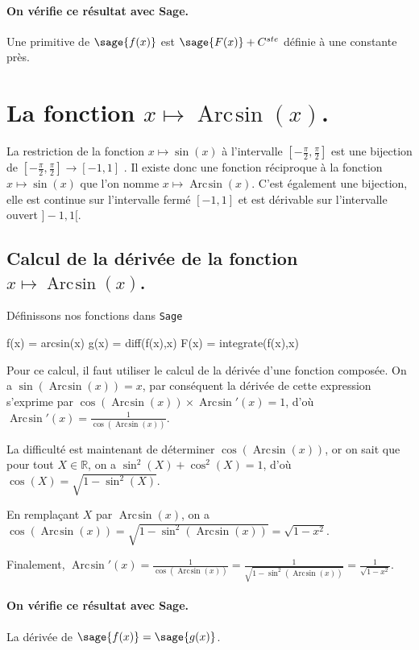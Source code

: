 \documentclass[a4paper,12pt]{report}
\def\eclaire{\mathbb}
\def\R{\ensuremath{\eclaire R}}
\renewcommand{\arcsin}{\mathop{\mathrm{Arc\mspace{2mu}sin}}}
\begin{document}
\paragraph{On vérifie ce résultat avec Sage.}
Une primitive de $\sage{f(x)}$ est $ \sage{F(x)} + C^{ste} $ définie à une constante près.





\section{La fonction  $x \mapsto \arcsin(x) $.}
La restriction de la fonction $x \mapsto \sin(x) $ à l'intervalle $\left[-\frac{\pi}{2},\frac{\pi}{2}\right]$ est une bijection de $\left[-\frac{\pi}{2},\frac{\pi}{2}\right] \rightarrow [-1,1]$ . Il existe donc une fonction réciproque à la fonction $x \mapsto \sin(x) $ que l'on nomme $x \mapsto \arcsin(x) $. C'est également une bijection, elle est continue sur l'intervalle fermé  $ [-1,1]$ et est dérivable sur l'intervalle ouvert $]-1,1[$.

\subsection{Calcul de la dérivée de la fonction $x \mapsto \arcsin(x) $.}
Définissons nos fonctions dans {\texttt{Sage}}
\begin{sageblock}
    f(x) = arcsin(x)
    g(x) = diff(f(x),x)
    F(x) = integrate(f(x),x)
\end{sageblock}

Pour ce calcul, il faut utiliser le calcul de la dérivée d'une fonction composée. On a $\sin(\arcsin(x))=x$, par conséquent la dérivée de cette expression s'exprime par $ \cos(\arcsin(x)) \times \arcsin\nolimits'(x) = 1$, d'où $\arcsin\nolimits'(x) = \frac{1}{\cos(\arcsin(x))} $.

La difficulté est maintenant de déterminer $\cos(\arcsin(x))$, or on sait que pour tout $X \in \R$, on a $\sin^2(X) + \cos^2(X) = 1$, d'où $\cos(X) = \sqrt{1-\sin^2(X)}$.

En remplaçant $X$ par $\arcsin(x)$, 
on a $\cos(\arcsin(x)) = \sqrt{1-\sin^2(\arcsin(x))} = \sqrt{1- x^2}$.

Finalement, $\arcsin\nolimits'(x)  = \frac{1}{\cos(\arcsin(x))}  = \frac{1}{\sqrt{1-\sin^2(\arcsin(x))}} =  \frac{1}{\sqrt{1- x^2}} $.
\paragraph{On vérifie ce résultat avec Sage.}
La dérivée de $\sage{f(x)} = \sage{g(x)} $.
\end{document}

